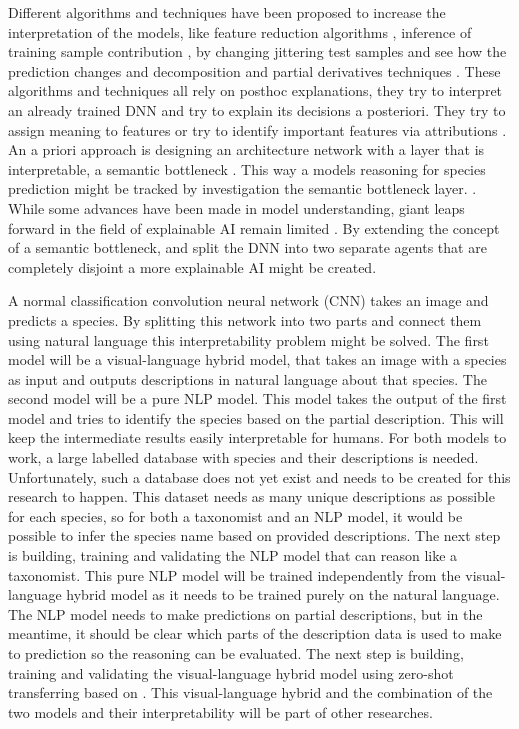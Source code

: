 \documentclass{article}
\begin{document}
Different algorithms and techniques have been proposed to increase the interpretation of the models, like feature reduction algorithms \autocite{ribeiro_why_2016}, inference of training sample contribution \autocite{koh_understanding_2020}, by changing jittering test samples and see how the prediction changes \autocite{li_understanding_2017} and decomposition and partial derivatives techniques \autocite{samek_explainable_2017}.
These algorithms and techniques all rely on posthoc explanations, they try to interpret an already trained DNN and try to explain its decisions a posteriori.
They try to assign meaning to features \autocite{fleet_visualizing_2014} or try to identify important features via attributions \autocite{zintgraf_visualizing_2017, selvaraju_grad-cam_2017}.
An a priori approach is designing an architecture network with a layer that is interpretable, a semantic bottleneck \autocite{bucher_semantic_2019}. 
This way a models reasoning for species prediction might be tracked by investigation the semantic bottleneck layer. \autocite{ishikawa_contextual_2021, losch_interpretability_2019}.
While some advances have been made in model understanding, giant leaps forward in the field of explainable AI remain limited \autocite{lipton_mythos_2017, li_interpretable_2021}.
By extending the concept of a semantic bottleneck, and split the DNN into two separate agents that are completely disjoint a more explainable AI might be created.

A normal classification convolution neural network (CNN) takes an image and predicts a species.
By splitting this network into two parts and connect them using natural language this interpretability problem might be solved.
The first model will be a visual-language hybrid model, that takes an image with a species as input and outputs descriptions in natural language about that species.
The second model will be a pure NLP model.
This model takes the output of the first model and tries to identify the species based on the partial description.
This will keep the intermediate results easily interpretable for humans.
For both models to work, a large labelled database with species and their descriptions is needed. 
Unfortunately, such a database does not yet exist and needs to be created for this research to happen.
This dataset needs as many unique descriptions as possible for each species, so for both a taxonomist and an NLP model, it would be possible to infer the species name based on provided descriptions.
The next step is building, training and validating the NLP model that can reason like a taxonomist.
This pure NLP model will be trained independently from the visual-language hybrid model as it needs to be trained purely on the natural language. 
The NLP model needs to make predictions on partial descriptions, but in the meantime, it should be clear which parts of the description data is used to make to prediction so the reasoning can be evaluated.
The next step is building, training and validating the visual-language hybrid model using zero-shot transferring based on \textcite{radford_learning_2021}.
This visual-language hybrid and the combination of the two models and their interpretability will be part of other researches.
\end{document}
